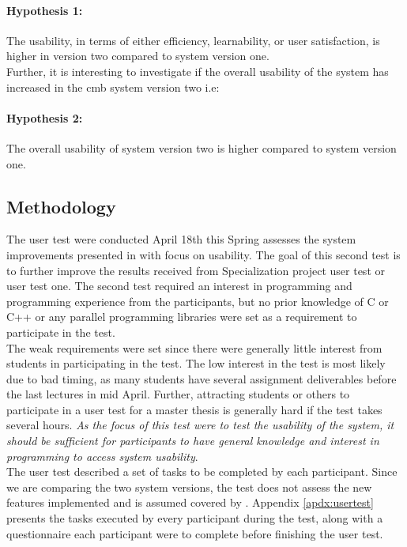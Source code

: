 \paragraph*{Hypothesis 1:} The usability, in terms of either efficiency, learnability, or user satisfaction, is higher in version two compared to system version one. \hfill \\

Further, it is interesting to investigate if the overall usability of the system has increased in the \gls{cmb} system version two i.e:

\paragraph*{Hypothesis 2:} The overall usability of system version two is higher compared to system version one. \hfill \\

\subsection{Methodology}
\label{sub-sec:user-testing-methodology}
The user test were conducted April 18th this Spring assesses the system improvements presented in  with focus on usability. The goal of this second test is to further improve the results received from Specialization project user test or user test one. The second test required an interest in programming and programming experience from the participants, but no prior knowledge of C or C++ or any parallel programming libraries were set as a requirement to participate in the test. \\

The weak requirements were set since there were generally little interest from students in participating in the test. The low interest in the test is most likely due to bad timing, as many students have several assignment deliverables before the last lectures in mid April. Further, attracting students or others to participate in a user test for a master thesis is generally hard if the test takes several hours. \textit{As the focus of this test were to test the usability of the system, it should be sufficient for participants to have general knowledge and interest in programming to access system usability}. \\

The user test described a set of tasks to be completed by each participant. Since we are comparing the two system versions, the test does not assess the new features implemented and is assumed covered by . Appendix \ref{apdx:usertest} presents the tasks executed by every participant during the test, along with a questionnaire each participant were to complete before finishing the user test. \\

